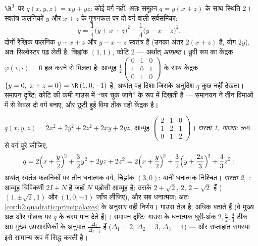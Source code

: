 \begin{example}[एक अपभ्रष्ट रूप, पूरा समानीत]\label{ex:b2:quadratic:degenerate}
$\R^3$ पर $q(x, y, z) = xy + yz$: कोई वर्ग नहीं, अतः समूहन $q = y(x + z)$ के साथ स्थिति 2। स्वतंत्र
फलनिकों $y$ और $x + z$ के गुणनफल पर दो-वर्ग वाली सर्वसमिका:
\[
q = \frac14\bigl(y + x + z\bigr)^2 -
\frac14\bigl(y - x - z\bigr)^2 .
\]
दोनों रैखिक फलनिक $y + x + z$ और $y - x - z$ स्वतंत्र हैं (उनका अंतर $2(x+z)$ है, योग $2y$),
अतः सिल्वेस्टर पढ़ लेती है: चिह्नांक $(1, 1)$, कोटि $2$ --- अर्थात्
\emph{अपभ्रष्ट}। ध्रुवी रूप का केंद्रक $\varphi(v, \cdot) = 0$ हल करने से मिलता है: आव्यूह
$\frac12\begin{pmatrix} 0&1&0\\ 1&0&1\\ 0&1&0\end{pmatrix}$
के साथ केंद्रक $\{y = 0,\ x + z = 0\} = \R\,(1, 0, -1)$ है, अर्थात् वह दिशा जिसके अनुदिश $q$ कुछ नहीं देखता।
समापन दृष्टि: कोटि की कमी गाउस में ``चर चुक जाने'' के रूप में दिखती है ---
समानयन ने तीन विमाओं में से केवल दो वर्ग बनाए, और छूटी हुई विमा ठीक वही
केंद्रक है।
\end{example}

\begin{example}[एक ही रूप, चिह्नांक तक दो रास्ते]\label{ex:b2:quadratic:tworoads}
$q(x, y, z) = 2x^2 + 2y^2 + 2z^2 + 2xy + 2yz$, आव्यूह $\begin{pmatrix} 2 & 1 & 0\\ 1 & 2 & 1\\ 0 & 1 & 2
\end{pmatrix}$। \emph{रास्ता 1, गाउस:} क्रम से वर्ग पूरे कीजिए,
\[
q = 2\Bigl(x + \frac y2\Bigr)^{\!2} + \frac32 y^2 + 2yz + 2z^2
= 2\Bigl(x + \frac y2\Bigr)^{\!2}
+ \frac32\Bigl(y + \frac{2z}{3}\Bigr)^{\!2} + \frac43 z^2 :
\]
अर्थात् स्वतंत्र फलनिकों पर तीन धनात्मक वर्ग, चिह्नांक $(3,
0)$: यानी धनात्मक
निश्चित। \emph{रास्ता 2, :} आव्यूह त्रिविकर्णी $2I + N$ है जहाँ
$N$ पड़ोसी आव्यूह है; उसके  $2 + \sqrt2$, $2$, $2 - \sqrt2$ हैं ( $(1, \pm\sqrt2, 1)$ और $(1, 0, -1)$ जाँच लीजिए), और सब धनात्मक: अतः \cref{cor:b2:quadratic:principalaxes} के अनुसार वही
निर्णय। गाउस तेज़ है;  अधिक बताते हैं (वे मुख्य अक्ष और
गोलक पर $q$ के चरम मान देते हैं)। समापन दृष्टि: गाउस के धनात्मक धुरी-अंक
$2, \frac32, \frac43$ ठीक अग्र मुख्य उपसारणिकों के अनुपात $\frac{\Delta_k}{\Delta_{k-1}}$ हैं ($\Delta_1 = 2$, $\Delta_2 = 3$, $\Delta_3 = 4$) ---
और सप्ताहांत समस्या इसे सामान्य रूप में सिद्ध करती है।
\end{example}

